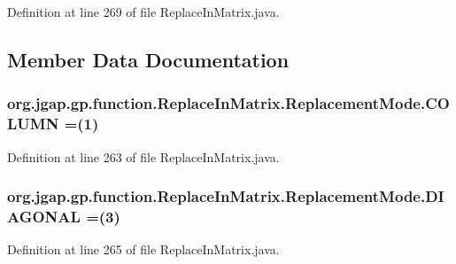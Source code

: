 Definition at line 269 of file Replace\-In\-Matrix.\-java.



\subsection{Member Data Documentation}
\hypertarget{enumorg_1_1jgap_1_1gp_1_1function_1_1_replace_in_matrix_1_1_replacement_mode_ab8468e524a7c38698199a914575a23f0}{
\subsubsection[{C\-O\-L\-U\-M\-N}]{\setlength{\rightskip}{0pt plus 5cm}org.\-jgap.\-gp.\-function.\-Replace\-In\-Matrix.\-Replacement\-Mode.\-C\-O\-L\-U\-M\-N =(1)}}\label{enumorg_1_1jgap_1_1gp_1_1function_1_1_replace_in_matrix_1_1_replacement_mode_ab8468e524a7c38698199a914575a23f0}


Definition at line 263 of file Replace\-In\-Matrix.\-java.

\hypertarget{enumorg_1_1jgap_1_1gp_1_1function_1_1_replace_in_matrix_1_1_replacement_mode_ad335308b54306fa05e92c7c4abfb57a8}{
\subsubsection[{D\-I\-A\-G\-O\-N\-A\-L}]{\setlength{\rightskip}{0pt plus 5cm}org.\-jgap.\-gp.\-function.\-Replace\-In\-Matrix.\-Replacement\-Mode.\-D\-I\-A\-G\-O\-N\-A\-L =(3)}}\label{enumorg_1_1jgap_1_1gp_1_1function_1_1_replace_in_matrix_1_1_replacement_mode_ad335308b54306fa05e92c7c4abfb57a8}


Definition at line 265 of file Replace\-In\-Matrix.\-java.

